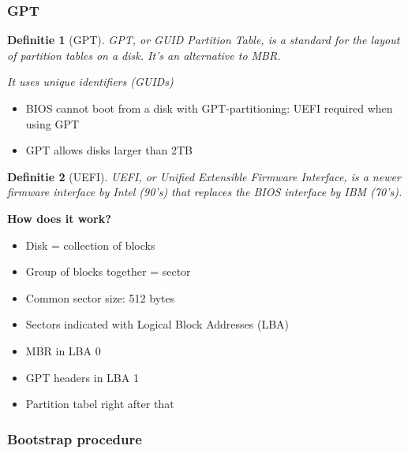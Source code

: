 \documentclass{article}
\newtheorem{theorem}{Definitie}[section]
\begin{document}
\subsubsection{GPT}

\begin{theorem}[GPT]
GPT, or GUID Partition Table, is a standard for the layout of partition tables on a disk.
It's an alternative to MBR.

It uses unique identifiers (GUIDs) 
\end{theorem}

\begin{itemize}
    \item BIOS cannot boot from a disk with GPT-partitioning: UEFI required when using GPT
    \item GPT allows disks larger than 2TB
\end{itemize}

\begin{theorem}[UEFI]
UEFI, or Unified Extensible Firmware Interface, is a newer firmware interface by Intel (90's) that replaces the BIOS interface by IBM (70's).
\end{theorem}

\textbf{How does it work?}

\begin{itemize}
    \item Disk = collection of blocks
    \item Group of blocks together = sector
    \item Common sector size: 512 bytes
    \item Sectors indicated with Logical Block Addresses (LBA)
    \item MBR in LBA 0
    \item GPT headers in LBA 1
    \item Partition tabel right after that
\end{itemize}




\subsubsection{Bootstrap procedure}
\end{document}
